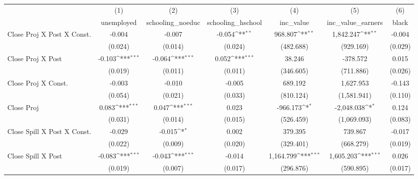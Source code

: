{
\def\sym#1{\ifmmode^{#1}\else\(^{#1}\)\fi}
\begin{tabular}{l*{6}{c}}
\hline\hline
                &\multicolumn{1}{c}{(1)}&\multicolumn{1}{c}{(2)}&\multicolumn{1}{c}{(3)}&\multicolumn{1}{c}{(4)}&\multicolumn{1}{c}{(5)}&\multicolumn{1}{c}{(6)}\\
                &\multicolumn{1}{c}{unemployed}&\multicolumn{1}{c}{schooling\_noeduc}&\multicolumn{1}{c}{schooling\_hschool}&\multicolumn{1}{c}{inc\_value}&\multicolumn{1}{c}{inc\_value\_earners}&\multicolumn{1}{c}{black}\\
\hline
Close Proj X Post X Const.&   -0.004         &   -0.007         &   -0.054\sym{**} &  968.807\sym{**} &1,842.247\sym{**} &   -0.004         \\
                &  (0.024)         &  (0.014)         &  (0.024)         &(482.688)         &(929.169)         &  (0.029)         \\
[1em]
Close Proj X Post&   -0.103\sym{***}&   -0.064\sym{***}&    0.052\sym{***}&   38.246         & -378.572         &    0.015         \\
                &  (0.019)         &  (0.011)         &  (0.011)         &(346.605)         &(711.886)         &  (0.026)         \\
[1em]
Close Proj X Const.&   -0.003         &   -0.010         &   -0.005         &  689.192         &1,627.953         &   -0.143         \\
                &  (0.054)         &  (0.021)         &  (0.033)         &(810.124)         &(1,581.941)         &  (0.110)         \\
[1em]
Close Proj      &    0.083\sym{***}&    0.047\sym{***}&    0.023         & -966.173\sym{*}  &-2,048.038\sym{*}  &    0.124         \\
                &  (0.031)         &  (0.014)         &  (0.015)         &(526.459)         &(1,069.093)         &  (0.083)         \\
[1em]
Close Spill X Post X Const.&   -0.029         &   -0.015\sym{*}  &    0.002         &  379.395         &  739.867         &   -0.017         \\
                &  (0.022)         &  (0.009)         &  (0.020)         &(329.401)         &(668.279)         &  (0.019)         \\
[1em]
Close Spill X Post&   -0.083\sym{***}&   -0.043\sym{***}&   -0.014         &1,164.799\sym{***}&1,605.203\sym{***}&    0.026         \\
                &  (0.019)         &  (0.007)         &  (0.017)         &(296.876)         &(590.895)         &  (0.017)         \\

\end{tabular}}

